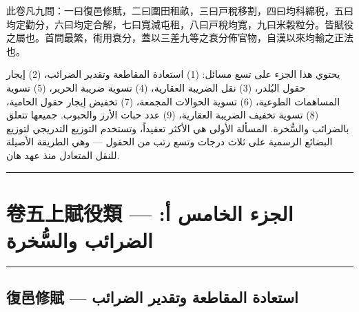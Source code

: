 \documentclass[11pt,a4paper]{article}
\newcommand{\ar}[1]{\arabicfont\beginR #1\endR}
\newcommand{\longline}{\noindent\rule{\textwidth}{0.4pt}}
\newcommand{\ChinCol}[1]{\begin{minipage}[t]{0.48\textwidth}#1\end{minipage}}
\newcommand{\ArabCol}[1]{\begin{minipage}[t]{0.48\textwidth}\arabicfont\beginR #1\endR\end{minipage}}
\newcommand{\parallelsection}[2]{%
  \noindent\ChinCol{#1}\hfill\ArabCol{#2}\par\vspace{0.5cm}%
}
\begin{document}
\parallelsection{%
此卷凡九問：一曰復邑修賦，二曰圍田租畝，三曰戸稅移割，四曰均科綿税，五曰均定勸分，六曰均定合解，七曰寬減屯租，八曰戸稅均寬，九曰米榖粒分。皆賦役之屬也。首問最繁，術用衰分，蓋以三差九等之衰分佈官物，自漢以來均輸之正法也。%
}{%
يحتوي هذا الجزء على تسع مسائل: (1) استعادة المقاطعة وتقدير الضرائب، (2) إيجار حقول البُلدر، (3) نقل الضريبة العقارية، (4) تسوية ضريبة الحرير، (5) تسوية المساهمات الطوعية، (6) تسوية الحوالات المجمعة، (7) تخفيض إيجار حقول الحامية، (8) تسوية تخفيف الضريبة العقارية، (9) عدد حبات الأرز والحبوب. جميعها تتعلق بالضرائب والسُّخرة. المسألة الأولى هي الأكثر تعقيداً، وتستخدم التوزيع التدريجي لتوزيع البضائع الرسمية على ثلاث درجات وتسع رتب من الحقول --- وهي الطريقة الأصيلة للنقل المتعادل منذ عهد هان.%
}

\vspace{0.5cm}
\longline
\newpage


\section*{卷五上\quad 賦役類 — \ar{الجزء الخامس أ: الضرائب والسُّخرة}}

\longline


\subsection*{\color{sectioncolor}復邑修賦 — \ar{استعادة المقاطعة وتقدير الضرائب}}
\end{document}
